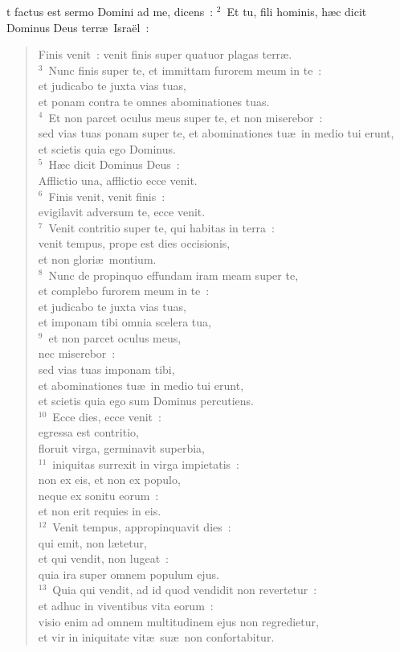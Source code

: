 \bchapter
{}t factus est sermo Domini ad me, dicens~:
${}^{2}$~Et tu, fili hominis, h\ae c dicit Dominus Deus terr\ae\ Isra\"el~: \begin{verse}Finis venit~: venit finis super quatuor plagas terr\ae .\\
${}^{3}$~Nunc finis super te, et immittam furorem meum in te~:\\ et judicabo te juxta vias tuas,\\ et ponam contra te omnes abominationes tuas.\\
${}^{4}$~Et non parcet oculus meus super te, et non miserebor~:\\ sed vias tuas ponam super te, et abominationes tu\ae\ in medio tui erunt,\\ et scietis quia ego Dominus.\\
${}^{5}$~H\ae c dicit Dominus Deus~:\\ Afflictio una, afflictio ecce venit.\\
${}^{6}$~Finis venit, venit finis~:\\ evigilavit adversum te, ecce venit.\\
${}^{7}$~Venit contritio super te, qui habitas in terra~:\\ venit tempus, prope est dies occisionis,\\ et non glori\ae\ montium.\\
${}^{8}$~Nunc de propinquo effundam iram meam super te,\\ et complebo furorem meum in te~:\\ et judicabo te juxta vias tuas,\\ et imponam tibi omnia scelera tua,\\
${}^{9}$~et non parcet oculus meus,\\ nec miserebor~:\\ sed vias tuas imponam tibi,\\ et abominationes tu\ae\ in medio tui erunt,\\ et scietis quia ego sum Dominus percutiens.\\
${}^{10}$~Ecce dies, ecce venit~:\\ egressa est contritio,\\ floruit virga, germinavit superbia,\\
${}^{11}$~iniquitas surrexit in virga impietatis~:\\ non ex eis, et non ex populo,\\ neque ex sonitu eorum~:\\ et non erit requies in eis.\\
${}^{12}$~Venit tempus, appropinquavit dies~:\\ qui emit, non l\ae tetur,\\ et qui vendit, non lugeat~:\\ quia ira super omnem populum ejus.\\
${}^{13}$~Quia qui vendit, ad id quod vendidit non revertetur~:\\ et adhuc in viventibus vita eorum~:\\ visio enim ad omnem multitudinem ejus non regredietur,\\ et vir in iniquitate vit\ae\ su\ae\ non confortabitur.\end{verse}


